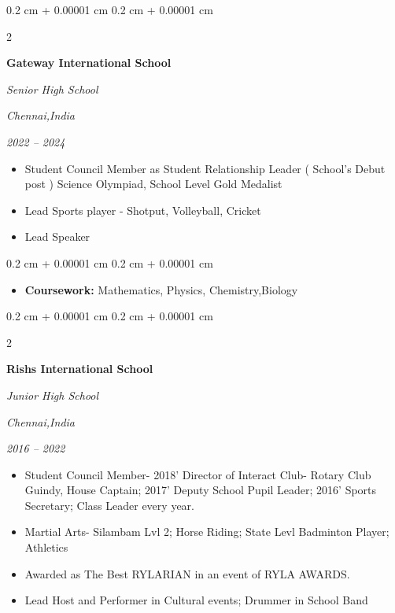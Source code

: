 \documentclass[10pt, letterpaper]{article}
\newenvironment{highlights}{
    \begin{itemize}[
        topsep=0.10 cm,
        parsep=0.10 cm,
        partopsep=0pt,
        itemsep=0pt,
        leftmargin=0.4 cm + 10pt
    ]
}{
    \end{itemize}
} %
\newenvironment{onecolentry}{
    \begin{adjustwidth}{
        0.2 cm + 0.00001 cm
    }{
        0.2 cm + 0.00001 cm
    }
}{
    \end{adjustwidth}
}
\newenvironment{twocolentry}[2][]{
    \onecolentry
    \def\secondColumn{#2}
    \setcolumnwidth{\fill, 4.5 cm}
    \begin{paracol}{2}
}{
    \switchcolumn \raggedleft \secondColumn
    \end{paracol}
    \endonecolentry
}
\begin{document}
   
        \vspace{0.2 cm}

 \begin{twocolentry}{
            \textit{Chennai,India}
            
        \textit{2022 – 2024}}
            \textbf{Gateway International School}

            \textit{Senior High School}
        \end{twocolentry}

        \vspace{0.10 cm}
         \begin{highlights}
                \item Student Council Member as Student Relationship Leader ( School's Debut post )  
                \itemNational Science Olympiad, School Level Gold Medalist
                \item Lead Sports player - Shotput, Volleyball, Cricket 
                \item Lead Speaker
            \end{highlights}
        \begin{onecolentry}
            \begin{highlights}
                \item \textbf{Coursework:} Mathematics, Physics, Chemistry,Biology
            \end{highlights}
        \end{onecolentry}
 

         \vspace{0.2 cm}


          \begin{twocolentry}{
            \textit{Chennai,India}
            
        \textit{2016 – 2022 }}
            \textbf{Rishs International School  }

            \textit{Junior High School}
        \end{twocolentry}

        \vspace{0.10 cm}

        \begin{highlights}
                \item Student Council Member- 2018' Director of Interact Club- Rotary Club Guindy, House Captain; 2017' Deputy School Pupil Leader; 2016' Sports Secretary; Class Leader every year.  
                \item Martial Arts- Silambam Lvl 2; Horse Riding; State Levl Badminton Player; Athletics 
                \item Awarded as The Best RYLARIAN in an event of RYLA AWARDS. 
                \item Lead Host and Performer in Cultural events; Drummer in School Band  
            \end{highlights}
            
\end{document}
